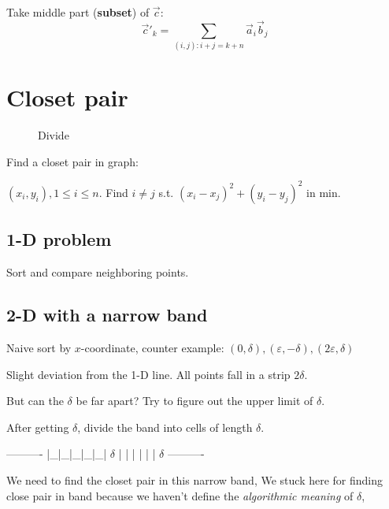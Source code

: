 \documentclass[a4paper]{report}
\begin{document}
Take middle part (\textbf{subset}) of $\vec c$:
$$
\vec c'_k =\sum_{(i,j): i+j= k+n} {\vec a_i \vec b_j}
$$

\section{Closet pair}
\begin{figure}[!htp]
\centering
{}
\caption{Divide}
\label{fig:5_6}
\end{figure}
Find a closet pair in graph: 

$(x_i, y_i), 1\leq i \leq n$. Find $i\neq j$ s.t. $(x_i-x_j)^2+(y_i-y_j)^2$ in min.

\subsection{1-D problem} 
Sort and compare neighboring points. 

\subsection{2-D with a narrow band}
Naive sort by $x$-coordinate, counter example: $(0, \delta), (\varepsilon,-\delta), (2\varepsilon,\delta)$

Slight deviation from the 1-D line. All points fall in a strip $2\delta$. 

But can the $\delta$ be far apart? Try to figure out the upper limit of $\delta$.

After getting $\delta$, divide the band into cells of length $\delta$. 
\begin{python}[mathescape]
----------
|_|_|_|_|_| $\delta$
| | | | | | $\delta$
----------
\end{python}

We need to find the closet pair in this narrow band, We stuck here for finding close pair in band because we haven't define the \textit{algorithmic meaning} of $\delta$, 
\end{document}
